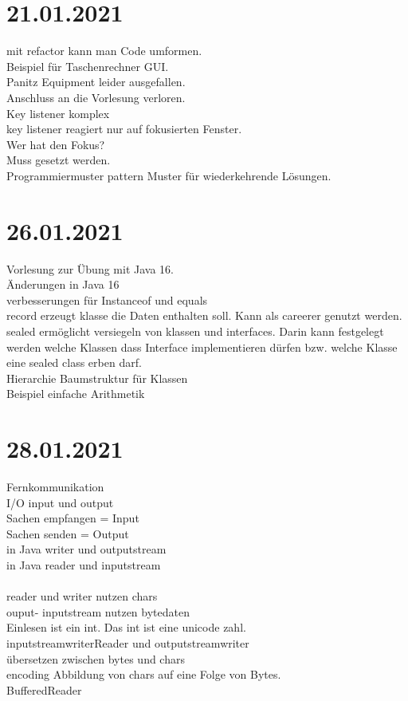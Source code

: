 \documentclass{article}
\begin{document}
	\section*{21.01.2021}
 	mit refactor kann man Code umformen. \\
 	Beispiel für Taschenrechner GUI. \\
 	Panitz Equipment leider ausgefallen.  \\
 	Anschluss an die Vorlesung verloren. \\
 	Key listener komplex \\
 	key listener reagiert nur auf fokusierten Fenster. \\
 	Wer hat den Fokus? \\
 	Muss gesetzt werden. \\
 	Programmiermuster pattern Muster für wiederkehrende Lösungen. \\
 	\section*{26.01.2021}
	Vorlesung zur Übung mit Java 16. \\
	Änderungen in Java 16 \\
	verbesserungen für Instanceof und equals \\
	record erzeugt klasse die Daten enthalten soll. Kann als careerer genutzt werden. \\
	sealed ermöglicht versiegeln von klassen und interfaces. Darin kann festgelegt werden welche Klassen dass Interface implementieren dürfen bzw. welche Klasse eine sealed class erben darf. \\
	Hierarchie Baumstruktur für Klassen \\
	Beispiel einfache Arithmetik \\
	\section*{28.01.2021}
	Fernkommunikation \\
	I/O input und output \\
	Sachen empfangen = Input \\
	Sachen senden = Output \\
	in Java writer und outputstream \\
	in Java reader und inputstream \\
	\\
	reader und writer nutzen chars \\
	ouput- inputstream nutzen bytedaten \\
	Einlesen ist ein int. Das int ist eine unicode zahl.\\
	inputstreamwriterReader und outputstreamwriter \\
	übersetzen zwischen bytes und chars \\
	encoding Abbildung von chars auf eine Folge von Bytes. \\
	BufferedReader \\
\end{document}
